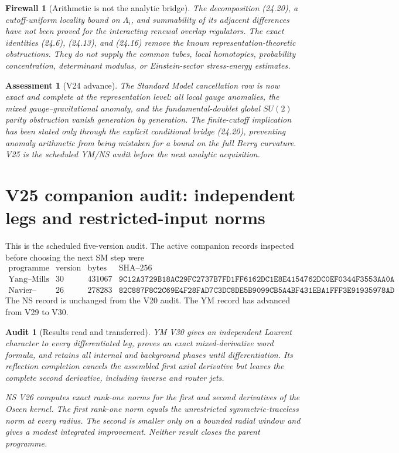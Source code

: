 \documentclass[11pt]{article}
\newtheorem{assessment}[theorem]{Assessment}
\newtheorem{firewall}[theorem]{Firewall}
\newtheorem{audit}[theorem]{Audit}
\begin{document}
\begin{firewall}[Arithmetic is not the analytic bridge]
\label{fw:v11v24-analytic-bridge}
The decomposition (24.20), a cutoff-uniform locality bound on
\(\Lambda_i\), and summability of its adjacent differences have not been
proved for the interacting renewal overlap regulators.  The exact
identities (24.6), (24.13), and (24.16) remove the known
representation-theoretic obstructions.  They do not supply the common
tubes, local homotopies, probability concentration, determinant modulus,
or Einstein-sector stress-energy estimates.
\end{firewall}

\begin{assessment}[V24 advance]
\label{ass:v11v24}
The Standard Model cancellation row is now exact and complete at the
representation level: all local gauge anomalies, the mixed
gauge--gravitational anomaly, and the fundamental-doublet global
\(SU(2)\) parity obstruction vanish generation by generation.  The
finite-cutoff implication has been stated only through the explicit
conditional bridge (24.20), preventing anomaly arithmetic from being
mistaken for a bound on the full Berry curvature.  V25 is the scheduled
YM/NS audit before the next analytic acquisition.
\end{assessment}
\section{V25 companion audit: independent legs and restricted-input norms}
\label{sec:v11v25}

This is the scheduled five-version audit.  The active companion records
inspected before choosing the next SM step were
\[
\begin{array}{c|c|r|l}
 \text{programme}&\text{version}&\text{bytes}&\text{SHA--256}\\ \hline
 \text{Yang--Mills}&30&431067&
 \texttt{9C12A3729B18AC29FC2737B7FD1FF6162DC1E8E4154762DC0EF0344F3553AA0A}\\
 \text{Navier--Stokes}&26&278283&
 \texttt{82C887F8C2C69E4F28FAD7C3DC8DE5B9099CB5A4BF431EBA1FFF3E91935978AD}
\end{array}
\tag{25.1}
\]
The NS record is unchanged from the V20 audit.  The YM record has
advanced from V29 to V30.

\begin{audit}[Results read and transferred]
\label{audit:v11v25-companions}
YM V30 gives an independent Laurent character to every differentiated
leg, proves an exact mixed-derivative word formula, and retains all
internal and background phases until differentiation.  Its reflection
completion cancels the assembled first axial derivative but leaves the
complete second derivative, including inverse and router jets.

NS V26 computes exact rank-one norms for the first and second derivatives
of the Oseen kernel.  The first rank-one norm equals the unrestricted
symmetric-traceless norm at every radius.  The second is smaller only on
a bounded radial window and gives a modest integrated improvement.
Neither result closes the parent programme.
\end{audit}
\end{document}
